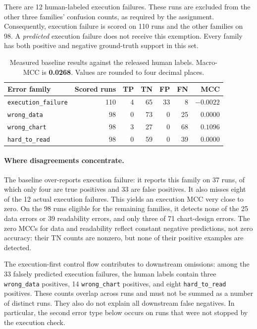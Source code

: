 \documentclass[11pt]{article}
\begin{document}
There are 12 human-labeled execution failures. These runs are excluded from
the other three families' confusion counts, as required by the assignment.
Consequently, execution failure is scored on 110 runs and the other families
on 98. A \emph{predicted} execution failure does not receive this exemption.
Every family has both positive and negative ground-truth support in this set.

\begin{table}[htbp]
\centering
\small
\begin{tabular}{lrrrrrr}
\toprule
Error family & Scored runs & TP & TN & FP & FN & MCC \\
\midrule
\texttt{execution\_failure} & 110 & 4 & 65 & 33 & 8 & $-0.0022$ \\
\texttt{wrong\_data}        & 98  & 0 & 73 & 0  & 25 & $0.0000$ \\
\texttt{wrong\_chart}       & 98  & 3 & 27 & 0  & 68 & $0.1096$ \\
\texttt{hard\_to\_read}     & 98  & 0 & 59 & 0  & 39 & $0.0000$ \\
\bottomrule
\end{tabular}
\caption{Measured baseline results against the released human labels.
Macro-MCC is \textbf{0.0268}. Values are rounded to four decimal places.}
\label{tab:baseline}
\end{table}

\paragraph{Where disagreements concentrate.}
The baseline over-reports execution failure: it reports this family on
37 runs, of which only four are true positives and 33 are false positives.
It also misses eight of the 12 actual execution failures. This yields an
execution MCC very close to zero.
On the 98 runs eligible for the remaining families, it detects none of the
25 data errors or 39 readability errors, and only three of 71 chart-design
errors. The zero MCCs for data and readability reflect constant negative
predictions, not zero accuracy: their TN counts are nonzero, but none of
their positive examples are detected.

The execution-first control flow contributes to downstream omissions:
among the 33 falsely predicted execution failures, the human labels contain
three \texttt{wrong\_data} positives, 14 \texttt{wrong\_chart} positives,
and eight \texttt{hard\_to\_read} positives. These counts overlap across runs
and must not be summed as a number of distinct runs.
They also do not explain all downstream false negatives. In particular,
the second error type below occurs on runs that were not stopped by the
execution check.
\end{document}
